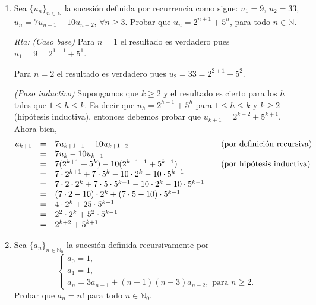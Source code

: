 \documentclass[a4paper,12pt,twoside,spanish,reqno]{amsbook}
\numberwithin{equation}{section}
\newcommand{\rta}{\noindent\textit{Rta: }}
\begin{document}
\begin{enumerate}
        
        \item Sea $\{ u_n \}_{n \in \mathbb N}$ la sucesión definida por recurrencia como sigue: $u_1 = 9$, $u_2 = 33$, $u_n = 7u_{n-1} - 10u_{n-2}$, $\forall n \geq 3$. Probar que $u_n = 2^{n+1} + 5^n$, para todo $n \in \mathbb N$.
        
        
        \rta         
        \textit{(Caso  base) } Para $n=1$ el resultado es verdadero pues $u_1 = 9 = 2^{1+1} + 5^1$.
        
        Para $n=2$ el resultado es verdadero pues $u_2 = 33 = 2^{2+1} + 5^2$.
        
        {\it (Paso  inductivo) } Supongamos que $k \ge 2$ y el resultado  es cierto para los $h$ tales que  $1 \le h \le k$. Es decir que $u_h = 2^{h+1} + 5^h$ para $1 \le h \le k$ y $k \ge 2$ (hipótesis inductiva), entonces debemos probar que $u_{k+1} = 2^{k+2}+5^{k+1}$. Ahora bien, 
        \begin{equation*}
        \begin{matrix}
        u_{k+1} &=& 7u_{k+1-1} - 10u_{k+1-2}  \hfill &\quad \text{(por definición recursiva)} \hfill \\
        &=& 7u_{k} - 10u_{k-1}  \hfill &\hfill\\
        &=& 7( 2^{k+1} + 5^k) -10 ( 2^{k-1+1} + 5^{k-1})  \hfill &\quad \text{(por hipótesis inductiva})\hfill \\
        &=& 7 \cdot  2^{k+1} + 7 \cdot 5^k -10 \cdot  2^{k} -10 \cdot  5^{k-1} \hfill  & \hfill\\
        &=& 7 \cdot 2 \cdot  2^{k} + 7 \cdot 5 \cdot 5^{k-1} -10 \cdot  2^{k} -10 \cdot  5^{k-1}  \hfill  & \hfill\\
        &=& (7 \cdot 2 -10 ) \cdot  2^{k} + (7 \cdot 5 -10) \cdot 5^{k-1}  \hfill  & \hfill\\
        &=& 4 \cdot  2^{k} + 25 \cdot 5^{k-1}  \hfill  & \hfill\\
        &=& 2^2 \cdot  2^{k} + 5^2 \cdot 5^{k-1}  \hfill  & \hfill\\
        &=& 2^{k+2} + 5^{k+1}  \hfill  & \hfill
        \end{matrix}
        \end{equation*}

        
    
        
        \item  Sea $\{a_n\}_{n\in\mathbb N_0}$ la sucesión definida recursivamente por
        $$\begin{cases}
        a_0=1, \\a_1=1, \\a_{n} = 3a_{n-1}+(n-1)(n-3)a_{n-2}, \text{ para $n\geq 2$}.
        \end{cases}$$
        Probar que $a_n=n!$ para todo $n\in \mathbb N_0$.


\end{enumerate}
\end{document}

